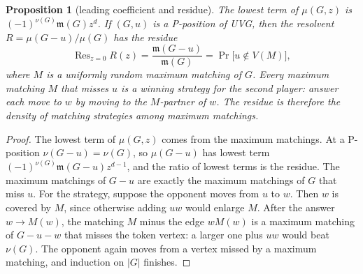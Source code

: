 \documentclass[11pt]{amsart}
\theoremstyle{plain}
\newtheorem{proposition}[theorem]{Proposition}
\theoremstyle{definition}
\theoremstyle{remark}
\numberwithin{equation}{section}
\newcommand{\mm}{\mathfrak{m}}            %
\newcommand{\Res}{\operatorname{Res}}
\begin{document}
\begin{proposition}[leading coefficient and residue]\label{prop:residue}
The lowest term of $\mu(G,z)$ is $(-1)^{\nu(G)}\mm(G)z^d$. If $(G,u)$ is a P-position of UVG, then the resolvent $R=\mu(G-u)/\mu(G)$ has the residue
\[
\Res_{z=0}R(z)=\frac{\mm(G-u)}{\mm(G)}=\Pr\bigl[u\notin V(M)\bigr],
\]
where $M$ is a uniformly random maximum matching of $G$.
Every maximum matching $M$ that misses $u$ is a winning strategy for the second player: answer each move to $w$ by moving to the $M$-partner of $w$. The residue is therefore the density of matching strategies among maximum matchings.
\end{proposition}
\begin{proof}
The lowest term of $\mu(G,z)$ comes from the maximum matchings. At a P-position $\nu(G-u)=\nu(G)$, so $\mu(G-u)$ has lowest term $(-1)^{\nu(G)}\mm(G-u)z^{d-1}$, and the ratio of lowest terms is the residue. The maximum matchings of $G-u$ are exactly the maximum matchings of $G$ that miss $u$. For the strategy, suppose the opponent moves from $u$ to $w$. Then $w$ is covered by $M$, since otherwise adding $uw$ would enlarge $M$. After the answer $w\to M(w)$, the matching $M$ minus the edge $wM(w)$ is a maximum matching of $G-u-w$ that misses the token vertex: a larger one plus $uw$ would beat $\nu(G)$. The opponent again moves from a vertex missed by a maximum matching, and induction on $|G|$ finishes.
\end{proof}
\end{document}
